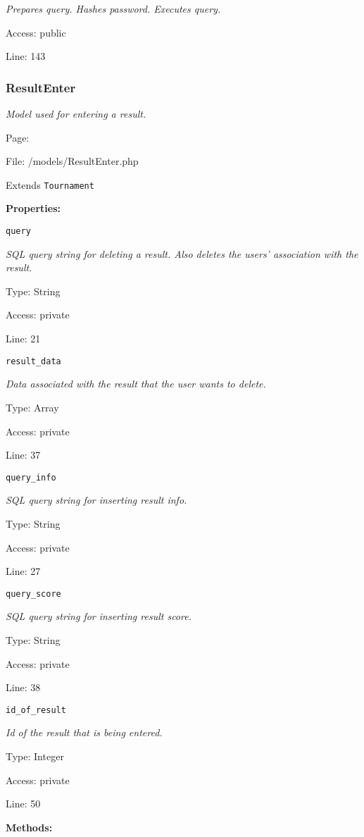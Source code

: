 {\scriptsize
\textit{Prepares query.
Hashes password.
Executes query.}

Access: public

Line: 143

}

\subsubsection{ResultEnter}\label{ResultEnter.php.doc}
\textit{Model used for entering a result.}

Page: \pageref{ResultEnter.php}

File: /models/ResultEnter.php

Extends \texttt{Tournament}

\textbf{Properties:}

\texttt{query}

{\scriptsize
\textit{SQL query string for deleting a result.
Also deletes the users' association with the result.}

Type: String

Access: private

Line: 21

}
\texttt{result\_data}

{\scriptsize
\textit{Data associated with the result that the user wants to delete.}

Type: Array

Access: private

Line: 37

}
\texttt{query\_info}

{\scriptsize
\textit{SQL query string for inserting result info.}

Type: String

Access: private

Line: 27

}
\texttt{query\_score}

{\scriptsize
\textit{SQL query string for inserting result score.}

Type: String

Access: private

Line: 38

}
\texttt{id\_of\_result}

{\scriptsize
\textit{Id of the result that is being entered.}

Type: Integer

Access: private

Line: 50

}
\textbf{Methods:}

